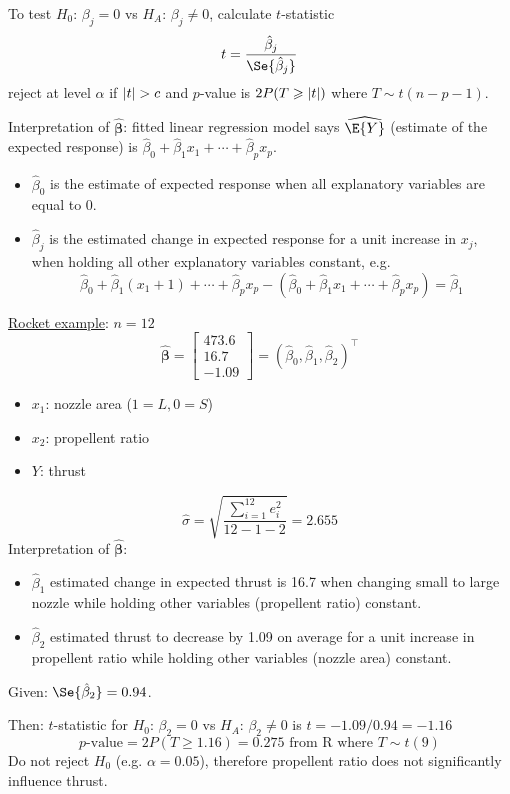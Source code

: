 To test $ H_0 $: $ \beta_j=0 $ vs $ H_A $: $ \beta_j\neq 0 $,
calculate $ t $-statistic
\[ t=\frac{\hat{\beta}_j}{\Se{\hat{\beta}_j}}  \]
reject at level $ \alpha $ if $ \lvert t\rvert>c $ and
$ p $-value is $ 2P(T\geqslant \lvert t\rvert) $ where $ T \sim t(n-p-1) $.

Interpretation of $ \hat{\symbf{\beta}} $: fitted linear
regression model says $ \widehat{\E{Y}} $
(estimate of the expected response) is
$ \hat{\beta}_0+\hat{\beta}_1x_1+\cdots+\hat{\beta}_p x_p $.
\begin{itemize}
    \item $ \hat{\beta}_0 $ is the estimate of expected response
          when all explanatory variables are equal to 0.
    \item $ \hat{\beta}_j $ is the estimated change
          in expected response for a unit increase in $ x_j $,
          when holding all other explanatory variables constant,
          e.g.\
          \[ \hat{\beta}_0+\hat{\beta}_1(x_1+1)+\cdots+\hat{\beta}_p x_p
              -(\hat{\beta}_0+\hat{\beta}_1 x_1+\cdots+\hat{\beta}_p x_p)=\hat{\beta}_1 \]
\end{itemize}

\underline{Rocket example}: $ n=12 $
\[ \hat{\symbf{\beta}}=\begin{bmatrix}
        473.6 \\
        16.7  \\
        -1.09
    \end{bmatrix}=(\hat{\beta}_0,\hat{\beta}_1,\hat{\beta}_2)^\top \]
\begin{itemize}
    \item $ x_1 $: nozzle area ($ 1 = L,0=S $)
    \item $ x_2 $: propellent ratio
    \item $ Y $: thrust
\end{itemize}
\[ \hat{\sigma}=\sqrt{\frac{\sum\limits_{i=1}^{12} e_i^2}{12-1-2}}=2.655 \]
Interpretation of $ \hat{\symbf{\beta}} $:
\begin{itemize}
    \item $ \hat{\beta}_1 $ estimated change in expected thrust is 16.7
          when changing small to large nozzle while holding other variables
          (propellent ratio) constant.
    \item $ \hat{\beta}_2 $ estimated thrust to decrease by 1.09 on average
          for a unit increase in propellent ratio while holding other
          variables (nozzle area) constant.
\end{itemize}
Given: $ \Se{\hat{\beta}_2}=0.94 $.

Then: $ t $-statistic for $ H_0 $: $ \beta_2=0 $ vs $ H_A $: $ \beta_2\neq 0 $
is $ t=-1.09/0.94=-1.16 $
\[ p\text{-value}=2P(T\geqslant 1.16)=0.275\text{ from R where } T \sim t(9)\]
Do not reject $ H_0 $ (e.g. $ \alpha=0.05 $), therefore
propellent ratio does not significantly influence thrust.
